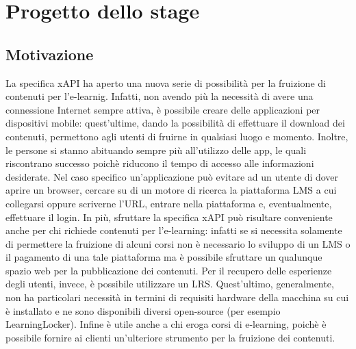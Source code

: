 \documentclass[../Tesi.tex]{subfiles}
\begin{document}
\section{Progetto dello stage}
	\subsection{Motivazione}
	La specifica xAPI ha aperto una nuova serie di possibilità per la fruizione di contenuti per l'e-learnig. Infatti, non avendo più la necessità di avere una connessione Internet sempre attiva, è possibile creare delle applicazioni per dispositivi mobile: quest'ultime, dando la possibilità di effettuare il download dei contenuti, permettono agli utenti di fruirne in qualsiasi luogo e momento. Inoltre, le persone si stanno abituando sempre più all'utilizzo delle app, le quali riscontrano successo poichè riducono il tempo di accesso alle informazioni desiderate. Nel caso specifico un'applicazione può evitare ad un utente di dover aprire un browser, cercare su di un motore di ricerca la piattaforma LMS a cui collegarsi oppure scriverne l'URL, entrare nella piattaforma e, eventualmente, effettuare il login. In più, sfruttare la specifica xAPI può risultare conveniente anche per chi richiede contenuti per l’e-learning: infatti se si necessita solamente di permettere la fruizione di alcuni corsi non è necessario lo sviluppo di un LMS o il pagamento di una tale piattaforma ma è possibile sfruttare un qualunque spazio web per la pubblicazione dei contenuti. Per il recupero delle esperienze degli utenti, invece, è possibile utilizzare un LRS. Quest'ultimo, generalmente, non ha particolari necessità in termini di requisiti hardware della macchina su cui è installato e ne sono disponibili diversi open-source (per esempio LearningLocker). Infine è utile anche a chi eroga corsi di e-learning, poichè è possibile fornire ai clienti un’ulteriore strumento per la fruizione dei contenuti.
\end{document}

